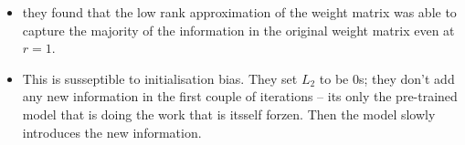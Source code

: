 \documentclass[11pt]{article}
\begin{document}
\begin{minipage}[l]{.5\linewidth}
    \begin{figure}[H]
        \centering
    \end{figure}    
\end{minipage}\hfill
\begin{minipage}[r]{.48\linewidth}
    \begin{itemize}
        \item they found that the low rank approximation of the weight matrix was able to capture the majority of the information in the original weight matrix even at $r=1$.
        \item This is susseptible to initialisation bias. They set $L_2$ to be 0s; they don't add any new information in the first couple of iterations -- its only the pre-trained model that is doing the work that is itsself forzen. Then the model slowly introduces the new information.
    \end{itemize}
\end{minipage}
\end{document}
